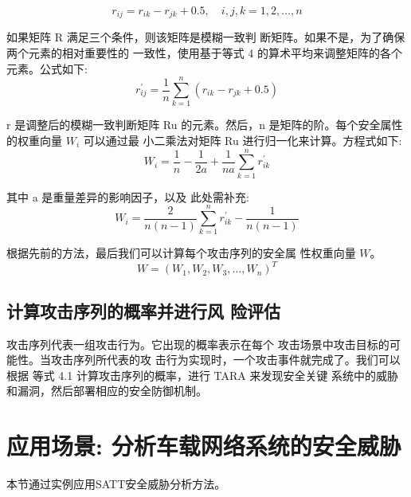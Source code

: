     \begin{equation}
    r_{i j}=r_{i k}-r_{j k}+0.5, \quad i, j, k=1,2, \ldots, n
    \end{equation}
    
如果矩阵 R 满足三个条件，则该矩阵是模糊一致判
断矩阵。如果不是，为了确保两个元素的相对重要性的
一致性，使用基于等式 4 的算术平均来调整矩阵的各个
元素。公式如下:
\begin{equation}
    r_{i j}^{\prime}=\frac{1}{n} \sum_{k=1}^n\left(r_{i k}-r_{j k}+0.5\right)
    \end{equation}

r 是调整后的模糊一致判断矩阵 Ru 的元素。然后，n
是矩阵的阶。每个安全属性的权重向量 $W_i$  可以通过最
小二乘法对矩阵 Ru 进行归一化来计算。方程式如下:
\begin{equation}
    W_i=\frac{1}{n}-\frac{1}{2 a}+\frac{1}{n a} \sum_{k=1}^n r_{i k}^{\prime}
    \end{equation}

    其中 a 是重量差异的影响因子，以及 此处需补充: 
    \begin{equation}
        W_i=\frac{2}{n(n-1)} \sum_{k=1}^n r_{i k}^{\prime}-\frac{1}{n(n-1)}
        \end{equation}
        
        根据先前的方法，最后我们可以计算每个攻击序列的安全属
性权重向量 $W$。
\begin{equation}
    W=\left(W_1, W_2, W_3, \ldots, W_n\right)^T
    \end{equation}

\subsection{计算攻击序列的概率并进行风
险评估}

攻击序列代表一组攻击行为。它出现的概率表示在每个
攻击场景中攻击目标的可能性。当攻击序列所代表的攻
击行为实现时，一个攻击事件就完成了。我们可以根据
等式 4.1 计算攻击序列的概率，进行 TARA 来发现安全关键
系统中的威胁和漏洞，然后部署相应的安全防御机制。
\newline


\section{应用场景: 分析车载网络系统的安全威胁}
本节通过实例应用SATT安全威胁分析方法。
